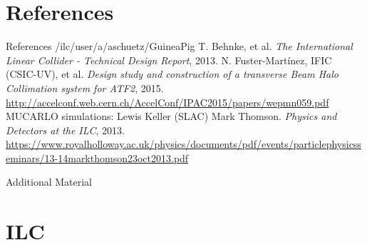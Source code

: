 \documentclass[xcolor={dvipsnames}]{beamer}
\begin{document}
\section*{References}
\begin{thebibliography}{9}
\begin{frame}{References}
 /ilc/user/a/aschuetz/GuineaPig
 T. Behnke, et al. \emph{The International Linear Collider - Technical Design Report}, 2013.
 N. Fuster-Martínez, IFIC (CSIC-UV), et al. \emph{Design study and construction of a transverse Beam Halo Collimation system for ATF2}, 2015. \url{http://accelconf.web.cern.ch/AccelConf/IPAC2015/papers/wepmn059.pdf}
 MUCARLO simulations: Lewis Keller (SLAC)
 Mark Thomson. \emph{Physics and Detectors at the ILC}, 2013. \url{https://www.royalholloway.ac.uk/physics/documents/pdf/events/particlephysicsseminars/13-14markthomson23oct2013.pdf}

\end{frame}
\end{thebibliography}

\appendix

\begin{frame}
\begin{center}
\LARGE Additional Material
\end{center}
  \tableofcontents
\end{frame}

\section{ILC}
\end{document}
